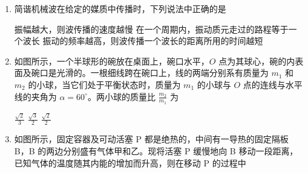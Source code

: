 \documentclass[\gkver]{gaokaozhenti}
\begin{document}
\begin{enumerate}
\item
简谐机械波在给定的媒质中传播时，下列说法中正确的是

{振幅越大，则波传播的速度越慢}
{在一个周期内，振动质元走过的路程等于一个波长}
{振动的频率越高，则波传播一个波长的距离所用的时间越短}


\item
如图所示，一个半球形的碗放在桌面上，碗口水平，$O$ 点为其球心，碗的内表面及碗口是光滑的。一根细线跨在碗口上，线的两端分别系有质量为 $m_{1}$ 和 $m_{2}$ 的小球，当它们处于平衡状态时，质量为 $m_{1}$ 的小球与 $O$ 点的连线与水平线的夹角为 $\alpha=60^{\circ}$。两小球的质量比 $\frac{m_{2}}{m_{1}}$ 为


{$\frac{\sqrt{2}}{3}$}
{$\frac{\sqrt{3}}{2}$}
{$\frac{\sqrt{2}}{2}$}


\item
如图所示，固定容器及可动活塞 P 都是绝热的，中间有一导热的固定隔板 B，B 的两边分别盛有气体甲和乙。现将活塞 P 缓慢地向 B 移动一段距离，已知气体的温度随其内能的增加而升高，则在移动 P 的过程中


\end{enumerate}
\end{document}
